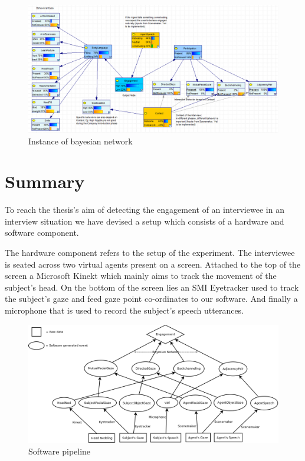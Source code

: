 \documentclass[12pt, a4paper, fleqn]{memoir}%
\begin{document}
\begin{figure}[h!]
    \centering
    \includegraphics[width=1\textwidth]{BN_state}
    \caption{Instance of bayesian network}
    \label{fig:BN_state}
\end{figure}


\chapter{Summary}
\label{Summary}
To reach the thesis's aim of detecting the engagement of an interviewee in an interview situation we have devised a setup which consists of a hardware and software component.

The hardware component refers to the setup of the experiment. The interviewee is seated across two virtual agents present on a screen. Attached to the top of the screen a Microsoft Kinekt which mainly aims to track the movement of the subject's head. On the bottom of the screen lies an SMI Eyetracker used to track the subject's gaze and feed gaze point co-ordinates to our software. And finally a microphone that is used to record the subject's speech utterances.

\begin{figure}[h!]
    \centering
    \includegraphics[width=1\textwidth]{Summery_diagram}
    \caption{Software pipeline}
    \label{fig:Summery_diagram}
\end{figure}
\end{document}
